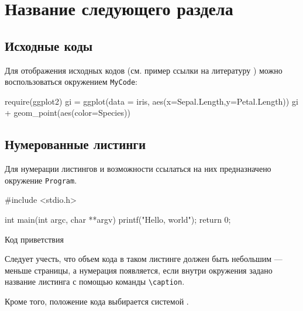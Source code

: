 
\section{Название следующего раздела}

\subsection{Исходные коды}

Для отображения исходных кодов (см. пример ссылки на литературу \cite{Rrus1}) можно  воспользоваться окружением \verb|MyCode|:

\begin{MyCode}
require(ggplot2)
gi = ggplot(data = iris, aes(x=Sepal.Length,y=Petal.Length))
gi + geom_point(aes(color=Species))
\end{MyCode}


\subsection{Нумерованные листинги}

Для нумерации листингов и возможности ссылаться на них  предназначено окружение \verb|Program|.

\begin{Program}
\begin{MyCode}
#include <stdio.h>

int main(int argc, char **argv){
  printf("Hello, world");
  return 0;
}
\end{MyCode}
\caption{Код приветствия}
\end{Program}

Следует учесть, что объем кода в таком листинге должен быть небольшим --- меньше страницы, а нумерация появляется, если внутри окружения задано название листинга с помощью команды \verb|\caption|. 

Кроме того, положение кода выбирается системой \LaTeXe.